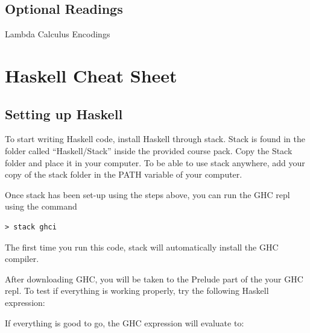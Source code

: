 \section{Optional
Readings}\label{functional-programming-paradigm.md__optional-readings}

Lambda Calculus Encodings

\chapter{Haskell Cheat
Sheet}\label{haskell-cheat-sheet.md__haskell-cheat-sheet}

\section{Setting up
Haskell}\label{haskell-cheat-sheet.md__setting-up-haskell}

To start writing Haskell code, install Haskell through stack. Stack is
found in the folder called ``Haskell/Stack'' inside the provided course
pack. Copy the Stack folder and place it in your computer. To be able to
use stack anywhere, add your copy of the stack folder in the PATH
variable of your computer.

Once stack has been set-up using the steps above, you can run the GHC
repl using the command

\begin{verbatim}
> stack ghci
\end{verbatim}

The first time you run this code, stack will automatically install the
GHC compiler.

After downloading GHC, you will be taken to the Prelude part of the your
GHC repl. To test if everything is working properly, try the following
Haskell expression:

\begin{Shaded}
\begin{Highlighting}[]
\OperatorTok{\textgreater{}} \NormalTok{ (} \OperatorTok{+} \NormalTok{)}
\end{Highlighting}
\end{Shaded}

If everything is good to go, the GHC expression will evaluate to:

\begin{Shaded}
\begin{Highlighting}[]
\end{Highlighting}
\end{Shaded}

